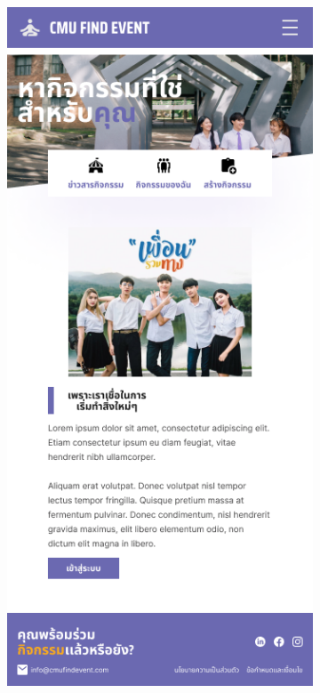\begin{figure}[h]
  \centering
  \begin{subfigure}[b]{0.3\linewidth}
    \includegraphics[width=\linewidth]{image/Figma-design/mobile-main.png}

\end{subfigure}
\end{figure}
